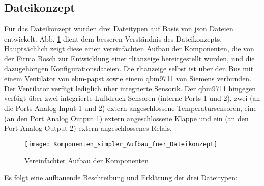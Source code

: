 \subsection{Dateikonzept} \label{json_config_files}
Für das Dateikonzept wurden drei Dateitypen auf Basis von \acs{json} Dateien entwickelt. Abb. \ref{fig:vereinfachter_aufbau_dateikonzept} dient dem besseren Verständnis des Dateikonzepts. Hauptsächlich zeigt diese einen vereinfachten Aufbau der Komponenten, die von der Firma Bösch zur Entwicklung einer \acs{rltanzeige} bereitgestellt wurden, und die dazugehörigen Konfigurationsdateien. Die \acs{rltanzeige} selbst ist über den Bus mit einem Ventilator von ebm-papst sowie einem \gls{qbm}9711 von Siemens verbunden. Der Ventilator verfügt lediglich über integrierte Sensorik. Der \gls{qbm}9711 hingegen verfügt über zwei integrierte Luftdruck-Sensoren (interne Ports 1 und 2), zwei (an die Ports Analog Input 1 und 2) extern angeschlossene Temperatursensoren, eine (an den Port Analog Output 1) extern angeschlossene Klappe und ein (an den Port Analog Output 2) extern angeschlossenes Relais.


\begin{figure}[H]
	\centering
	\texttt{[image: Komponenten\_simpler\_Aufbau\_fuer\_Dateikonzept]}
	\caption{Vereinfachter Aufbau der Komponenten \label{fig:vereinfachter_aufbau_dateikonzept}}
\end{figure}

\newpage
Es folgt eine aufbauende Beschreibung und Erklärung der drei Dateitypen:

